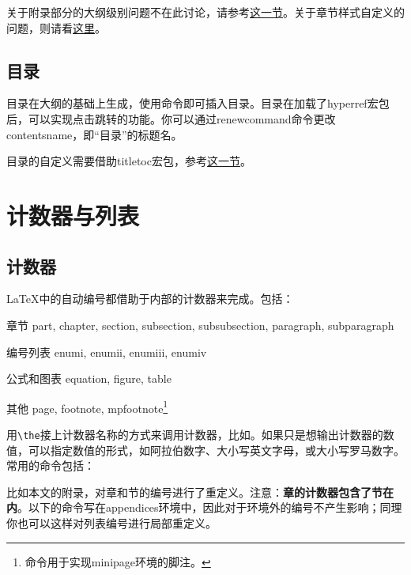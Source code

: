 {关于附录部分的大纲级别问题不在此讨论，请参考\hyperref[sec:appendix]{这一节}。关于章节样式自定义的问题，则请看\hyperref[sec:titlesec]{这里}。

\subsection{目录}
目录在大纲的基础上生成，使用命令\latexline{\\tableofcontents}即可插入目录。目录在加载了hyperref宏包后，可以实现点击跳转的功能。你可以通过renewcommand命令更改contentsname，即“目录”的标题名。

目录的自定义需要借助titletoc宏包，参考\hyperref[sec:titletoc]{这一节}。

\section{计数器与列表}

\subsection{计数器}
\LaTeX 中的自动编号都借助于内部的计数器来完成。包括：
\begin{fead}
\item[章节] part, chapter, section, subsection, subsubsection, paragraph, subparagraph
\item[编号列表] enumi, enumii, enumiii, enumiv
\item[公式和图表] equation, figure, table
\item[其他] page, footnote, mpfootnote\footnote{\latexline{\\mpfootnote}命令用于实现minipage环境的脚注。}
\end{fead}

用\verb|\the|接上计数器名称的方式来调用计数器，比如\latexline{\\thechapter}。如果只是想输出计数器的数值，可以指定数值的形式，如阿拉伯数字、大小写英文字母，或大小写罗马数字。常用的命令包括：
\begin{latex}{}
\Alph \alph \Roman \roman
\end{latex}

比如本文的附录，对章和节的编号进行了重定义。注意：\textbf{章的计数器包含了节在内}。以下的命令写在appendices环境中，因此对于环境外的编号不产生影响；同理你也可以这样对列表编号进行局部重定义。
\begin{latex}{}
\renewcommand{\thechapter}{\Alph{chapter}}
\renewcommand{\thesection}
    {\thechapter-\arabic{section}}
\end{latex}

}
